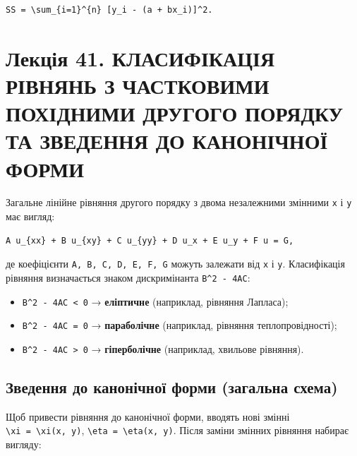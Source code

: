\documentclass[
  ukrainian,
]{article}
\providecommand{\tightlist}{%
  \setlength{\itemsep}{0pt}\setlength{\parskip}{0pt}}
\begin{document}
\begin{verbatim}
SS = \sum_{i=1}^{n} [y_i - (a + bx_i)]^2.
\end{verbatim}

\section{Лекція 41. КЛАСИФІКАЦІЯ РІВНЯНЬ З ЧАСТКОВИМИ ПОХІДНИМИ ДРУГОГО
ПОРЯДКУ ТА ЗВЕДЕННЯ ДО КАНОНІЧНОЇ
ФОРМИ}\label{ux43bux435ux43aux446ux456ux44f-41.-ux43aux43bux430ux441ux438ux444ux456ux43aux430ux446ux456ux44f-ux440ux456ux432ux43dux44fux43dux44c-ux437-ux447ux430ux441ux442ux43aux43eux432ux438ux43cux438-ux43fux43eux445ux456ux434ux43dux438ux43cux438-ux434ux440ux443ux433ux43eux433ux43e-ux43fux43eux440ux44fux434ux43aux443-ux442ux430-ux437ux432ux435ux434ux435ux43dux43dux44f-ux434ux43e-ux43aux430ux43dux43eux43dux456ux447ux43dux43eux457-ux444ux43eux440ux43cux438}

Загальне лінійне рівняння другого порядку з двома незалежними змінними
\texttt{x} і \texttt{y} має вигляд:

\begin{verbatim}
A u_{xx} + B u_{xy} + C u_{yy} + D u_x + E u_y + F u = G,
\end{verbatim}

де коефіцієнти \texttt{A,\ B,\ C,\ D,\ E,\ F,\ G} можуть залежати від
\texttt{x} і \texttt{y}. Класифікація рівняння визначається знаком
дискримінанта \texttt{B\^{}2\ -\ 4AC}:

\begin{itemize}
\tightlist
\item
  \texttt{B\^{}2\ -\ 4AC\ \textless{}\ 0} → \textbf{еліптичне}
  (наприклад, рівняння Лапласа);
\item
  \texttt{B\^{}2\ -\ 4AC\ =\ 0} → \textbf{параболічне} (наприклад,
  рівняння теплопровідності);
\item
  \texttt{B\^{}2\ -\ 4AC\ \textgreater{}\ 0} → \textbf{гіперболічне}
  (наприклад, хвильове рівняння).
\end{itemize}

\subsection{Зведення до канонічної форми (загальна
схема)}\label{ux437ux432ux435ux434ux435ux43dux43dux44f-ux434ux43e-ux43aux430ux43dux43eux43dux456ux447ux43dux43eux457-ux444ux43eux440ux43cux438-ux437ux430ux433ux430ux43bux44cux43dux430-ux441ux445ux435ux43cux430}

Щоб привести рівняння до канонічної форми, вводять нові змінні
\texttt{\textbackslash{}xi\ =\ \textbackslash{}xi(x,\ y)},
\texttt{\textbackslash{}eta\ =\ \textbackslash{}eta(x,\ y)}. Після
заміни змінних рівняння набирає вигляду:
\end{document}
